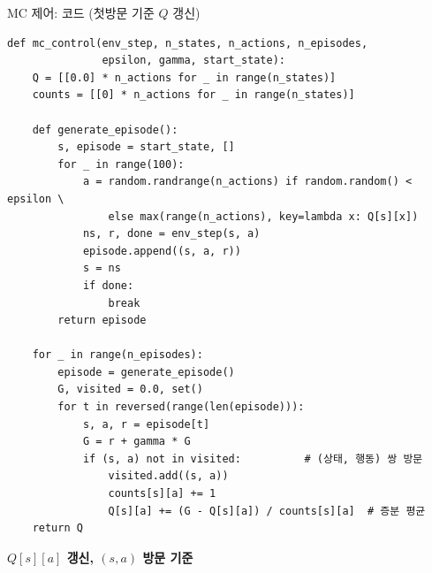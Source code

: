 \begin{frame}[fragile,shrink=30]{MC 제어: 코드 (첫방문 기준 $Q$ 갱신)}
\begin{lstlisting}
def mc_control(env_step, n_states, n_actions, n_episodes,
               epsilon, gamma, start_state):
    Q = [[0.0] * n_actions for _ in range(n_states)]
    counts = [[0] * n_actions for _ in range(n_states)]

    def generate_episode():
        s, episode = start_state, []
        for _ in range(100):
            a = random.randrange(n_actions) if random.random() < epsilon \
                else max(range(n_actions), key=lambda x: Q[s][x])
            ns, r, done = env_step(s, a)
            episode.append((s, a, r))
            s = ns
            if done:
                break
        return episode

    for _ in range(n_episodes):
        episode = generate_episode()
        G, visited = 0.0, set()
        for t in reversed(range(len(episode))):
            s, a, r = episode[t]
            G = r + gamma * G
            if (s, a) not in visited:          # (상태, 행동) 쌍 방문
                visited.add((s, a))
                counts[s][a] += 1
                Q[s][a] += (G - Q[s][a]) / counts[s][a]  # 증분 평균
    return Q
\end{lstlisting}
  \textbf{$Q[s][a]$ 갱신, $(s,a)$ 방문 기준}

\end{frame}
